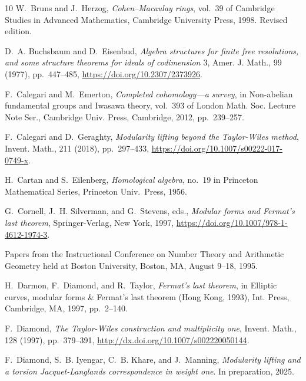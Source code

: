 \documentclass[twoside,leqno]{article}
\begin{document}
\begin{thebibliography}{10}
{\sc W.~Bruns and J.~Herzog}, {\em {Cohen--Macaulay rings}}, vol.~39 of
  Cambridge Studies in Advanced Mathematics, Cambridge University Press, 1998.
\newblock Revised edition.

{\sc D.~A. Buchsbaum and D.~Eisenbud}, {\em Algebra structures for finite free
  resolutions, and some structure theorems for ideals of codimension {$3$}},
  Amer. J. Math., 99 (1977), pp.~447--485,
   \url{https://doi.org/10.2307/2373926}.

{\sc F.~Calegari and M.~Emerton}, {\em Completed cohomology---a survey}, in
  Non-abelian fundamental groups and {I}wasawa theory, vol.~393 of London Math.
  Soc. Lecture Note Ser., Cambridge Univ. Press, Cambridge, 2012, pp.~239--257.

{\sc F.~Calegari and D.~Geraghty}, {\em Modularity lifting beyond the
  {T}aylor-{W}iles method}, Invent. Math., 211 (2018), pp.~297--433,
  \url{https://doi.org/10.1007/s00222-017-0749-x}.

{\sc H.~Cartan and S.~Eilenberg}, {\em {Homological algebra}}, no.~19 in
  Princeton Mathematical Series, Princeton Univ.\ Press, 1956.

{\sc G.~Cornell, J.~H. Silverman, and G.~Stevens}, eds., {\em Modular forms and
  {F}ermat's last theorem}, Springer-Verlag, New York, 1997,
  \url{https://doi.org/10.1007/978-1-4612-1974-3}.

\newblock Papers from the Instructional Conference on Number Theory and
  Arithmetic Geometry held at Boston University, Boston, MA, August 9--18,
  1995.

{\sc H.~Darmon, F.~Diamond, and R.~Taylor}, {\em Fermat's last theorem}, in
  Elliptic curves, modular forms \& {F}ermat's last theorem ({H}ong {K}ong,
  1993), Int. Press, Cambridge, MA, 1997, pp.~2--140.

{\sc F.~Diamond}, {\em The {T}aylor-{W}iles construction and multiplicity one},
  Invent. Math., 128 (1997), pp.~379--391,
  \url{http://dx.doi.org/10.1007/s002220050144}.

{\sc F.~Diamond, S.~B. Iyengar, C.~B. Khare, and J.~Manning}, {\em Modularity
  lifting and a torsion {J}acquet-{L}anglands correspondence in weight one}.
\newblock In preparation, 2025.


\end{thebibliography}
\end{document}
